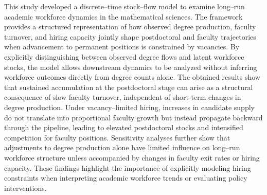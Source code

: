 \documentclass[3p]{elsarticle}%
\theoremstyle{definition}
\begin{document}
\noindent This study developed a discrete--time stock–flow model to examine long--run academic workforce dynamics in the mathematical sciences. The framework provides a structured representation of how observed degree production, faculty turnover, and hiring capacity jointly shape postdoctoral and faculty trajectories when advancement to permanent positions is constrained by vacancies. By explicitly distinguishing between observed degree flows and latent workforce stocks, the model allows downstream dynamics to be analyzed without inferring workforce outcomes directly from degree counts alone. The obtained results show that sustained accumulation at the postdoctoral stage can arise as a structural consequence of slow faculty turnover, independent of short-term changes in degree production. Under vacancy--limited hiring, increases in candidate supply do not translate into proportional faculty growth but instead propagate backward through the pipeline, leading to elevated postdoctoral stocks and intensified competition for faculty positions. Sensitivity analyses further show that adjustments to degree production alone have limited influence on long--run workforce structure unless accompanied by changes in faculty exit rates or hiring capacity. These findings highlight the importance of explicitly modeling hiring constraints when interpreting academic workforce trends or evaluating policy interventions. \\
\end{document}
